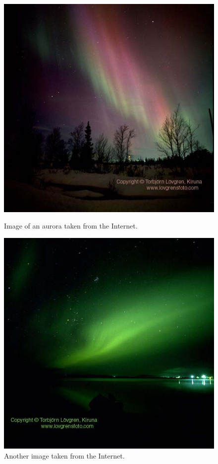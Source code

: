 \documentclass{article}
\begin{document}
\begin{figure}[ht]
\begin{minipage}[b]{0.5\linewidth}
\centering
\includegraphics[scale=1.8]{Figures/awowa2.jpg}
\caption{Image of an aurora taken from the Internet.}
\label{fig:Awowa1}
\end{minipage}
\hspace{0.5cm}
\begin{minipage}[b]{0.5\linewidth}
\centering
\includegraphics[scale=1.8]{Figures/awowa1.jpg}
\caption{Another image taken from the Internet.}
\label{fig:Awowa2}
\end{minipage}
\end{figure}
\end{document}
